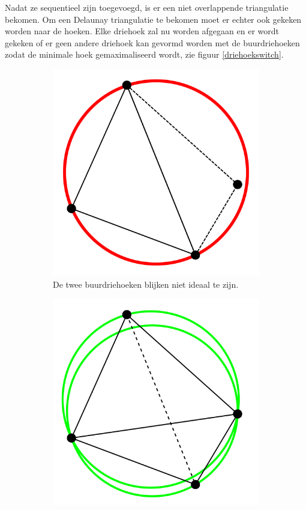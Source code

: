Nadat ze sequentieel zijn toegevoegd, is er een niet overlappende triangulatie bekomen. Om een Delaunay triangulatie te bekomen moet er echter ook gekeken worden naar de hoeken. Elke driehoek zal nu worden afgegaan en er wordt gekeken of er geen andere driehoek kan gevormd worden met de buurdriehoeken zodat de minimale hoek gemaximaliseerd wordt, zie figuur \ref{driehoekswitch}. \cite{s-hull}
\begin{figure}

	\center
	\begin{subfigure}{0.4\textwidth}
		\includegraphics[width=\textwidth]{slechte_driehoek}
		\caption{De twee buurdriehoeken blijken niet ideaal te zijn.}
	\end{subfigure}
	\begin{subfigure}{0.4\textwidth}
		\includegraphics[width=\textwidth]{goede_driehoek}

\end{subfigure}
\end{figure}
